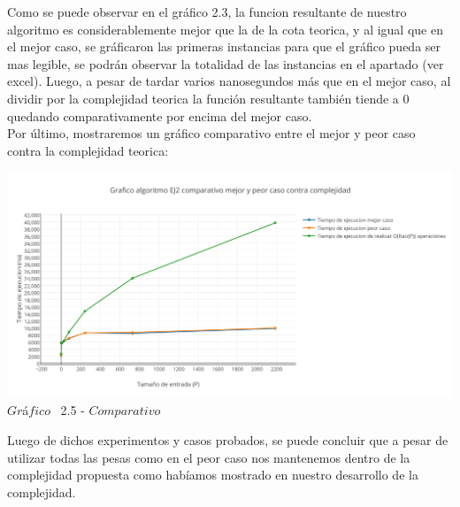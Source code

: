 Como se puede observar en el gr\'afico 2.3, la funcion resultante de nuestro algoritmo es considerablemente mejor que la de la cota teorica, y al igual que en el mejor caso, se gr\'aficaron las primeras instancias para que el gr\'afico pueda ser mas legible, se podr\'an observar la totalidad de las instancias en el apartado (ver excel).
Luego, a pesar de tardar varios nanosegundos m\'as que en el mejor caso, al dividir por la complejidad teorica
la función resultante tambi\'en tiende a 0 quedando comparativamente por encima del mejor caso.\\

Por \'ultimo, mostraremos un gr\'afico comparativo entre el mejor y peor caso contra la complejidad teorica:\\

\vspace*{0.3cm} \vspace*{0.3cm}
  \begin{center}
 \includegraphics[scale=0.65]{./EJ2/comparativo1.png}
 {$Gr$\'a$fico$ \ 2.5 - $Comparativo$}
  \end{center}
  \vspace*{0.3cm}

Luego de dichos experimentos y casos probados, se puede concluir que a pesar de utilizar todas las pesas como en el peor caso nos mantenemos dentro de la complejidad propuesta como hab\'iamos mostrado en nuestro desarrollo de la complejidad.\\
